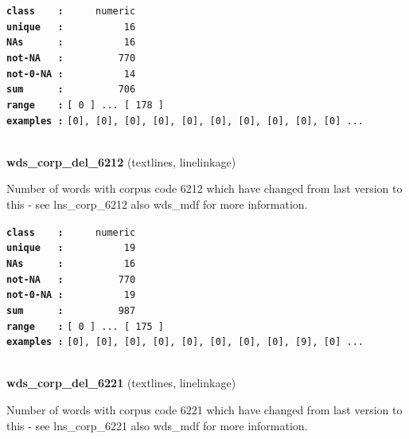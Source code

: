 \documentclass[]{article}
\begin{document}
\textbf{\texttt{class\ \ \ \ :}} \texttt{~~~~~numeric}\\
\textbf{\texttt{unique\ \ \ :}} \texttt{~~~~~~~~~~16}\\
\textbf{\texttt{NAs\ \ \ \ \ \ :}} \texttt{~~~~~~~~~~16}\\
\textbf{\texttt{not-NA\ \ \ :}} \texttt{~~~~~~~~~770}\\
\textbf{\texttt{not-0-NA\ :}} \texttt{~~~~~~~~~~14}\\
\textbf{\texttt{sum\ \ \ \ \ \ :}} \texttt{~~~~~~~~~706}\\
\textbf{\texttt{range\ \ \ \ :}}
\texttt{{[}\ 0\ {]}\ ...\ {[}\ 178\ {]}}\\
\textbf{\texttt{examples\ :}}
\texttt{{[}0{]},\ {[}0{]},\ {[}0{]},\ {[}0{]},\ {[}0{]},\ {[}0{]},\ {[}0{]},\ {[}0{]},\ {[}0{]},\ {[}0{]}\ ...}\\

~

\textbf{wds\_corp\_del\_6212} (textlines, linelinkage)

Number of words with corpus code 6212 which have changed from last
version to this - see lns\_corp\_6212 also wds\_mdf for more
information.

\textbf{\texttt{class\ \ \ \ :}} \texttt{~~~~~numeric}\\
\textbf{\texttt{unique\ \ \ :}} \texttt{~~~~~~~~~~19}\\
\textbf{\texttt{NAs\ \ \ \ \ \ :}} \texttt{~~~~~~~~~~16}\\
\textbf{\texttt{not-NA\ \ \ :}} \texttt{~~~~~~~~~770}\\
\textbf{\texttt{not-0-NA\ :}} \texttt{~~~~~~~~~~19}\\
\textbf{\texttt{sum\ \ \ \ \ \ :}} \texttt{~~~~~~~~~987}\\
\textbf{\texttt{range\ \ \ \ :}}
\texttt{{[}\ 0\ {]}\ ...\ {[}\ 175\ {]}}\\
\textbf{\texttt{examples\ :}}
\texttt{{[}0{]},\ {[}0{]},\ {[}0{]},\ {[}0{]},\ {[}0{]},\ {[}0{]},\ {[}0{]},\ {[}0{]},\ {[}9{]},\ {[}0{]}\ ...}\\

~

\textbf{wds\_corp\_del\_6221} (textlines, linelinkage)

Number of words with corpus code 6221 which have changed from last
version to this - see lns\_corp\_6221 also wds\_mdf for more
information.
\end{document}
